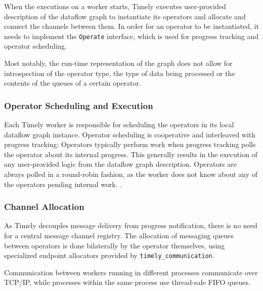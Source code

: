 \begin{addedbar}
When the executions on a worker starts, Timely executes user-provided
description of the dataflow graph to instantiate its operators and allocate
and connect the channels between them. In order for an operator to be
instantiated, it needs to implement the \lstinline{Operate} interface, which
is used for progress tracking and operator scheduling.

Most notably, the run-time representation of the graph does not allow for
introspection of the operator type, the type of data being processed or
the contents of the queues of a certain operator.

\subsubsection{Operator Scheduling and Execution}

Each Timely worker is responsible for scheduling the operators in its local
dataflow graph instance. Operator scheduling is cooperative and interleaved 
with progress tracking: Operators typically perform work when progress tracking
polls the operator about its internal progress. This generally results in the
execution of any user-provided logic from the dataflow graph description.
Operators are always polled in a round-robin fashion, as the worker does
not know about any of the operators pending internal work. .

\subsubsection{Channel Allocation}

As Timely decouples message delivery from progress notification, there is no
need for a central message channel registry. The allocation of messaging
queues between operators is done bilaterally by the operator themselves,
using specialized endpoint allocators provided by \lstinline{timely_communication}.

Communication between workers running in different
processes communicate over TCP/IP, while processes within the same process
use thread-safe FIFO queues.

\end{addedbar}
